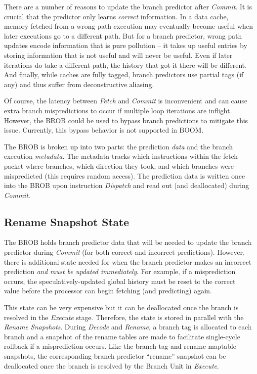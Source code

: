 There are a number of reasons to update the branch predictor after {\em Commit}. It is crucial that the predictor only learns {\em correct} information. In a data cache, memory fetched from a wrong path execution may eventually become useful when later executions go to a different path.  But for a branch predictor, wrong path updates encode information that is pure pollution -- it takes up useful entries by storing information that is not useful and will never be useful.  Even if later iterations do take a different path, the history that got it there will be different. And finally, while caches are fully tagged, branch predictors use partial tags (if any) and thus suffer from deconstructive aliasing.

Of course, the latency between {\em Fetch} and {\em Commit} is inconvenient and can cause extra branch mispredictions to occur if multiple loop iterations are inflight. However, the BROB could be used to bypass branch predictions to mitigate this issue. Currently, this bypass behavior is not supported in BOOM.

The BROB is broken up into two parts: the prediction {\em data} and the branch execution {\em metadata}.  The metadata tracks which instructions within the fetch packet where branches, which direction they took, and which branches were mispredicted (this requires random access). The prediction data is written once into the BROB upon instruction {\em Dispatch} and read out (and deallocated) during {\em Commit}.


\subsection{Rename Snapshot State}\label{sec:bpd-rename}

The BROB holds branch predictor data that will be needed to update the branch predictor during {\em Commit} (for both correct and incorrect predictions).  However, there is additional state needed for when the branch predictor makes an incorrect prediction {\em and must be updated immediately}.  For example, if a misprediction occurs, the speculatively-updated global history must be reset to the correct value before the processor can begin fetching (and predicting) again. 

This state can be very expensive but it can be deallocated once the branch is resolved in the {\em Execute} stage. Therefore, the state is stored in parallel with the {\em Rename Snapshots}.  During {\em Decode} and {\em Rename}, a branch tag is allocated to each branch and a snapshot of the rename tables are made to facilitate single-cycle rollback if a misprediction occurs.  Like the branch tag and rename maptable snapshots, the corresponding branch predictor ``rename'' snapshot can be deallocated once the branch is resolved by the Branch Unit in {\em Execute}.



